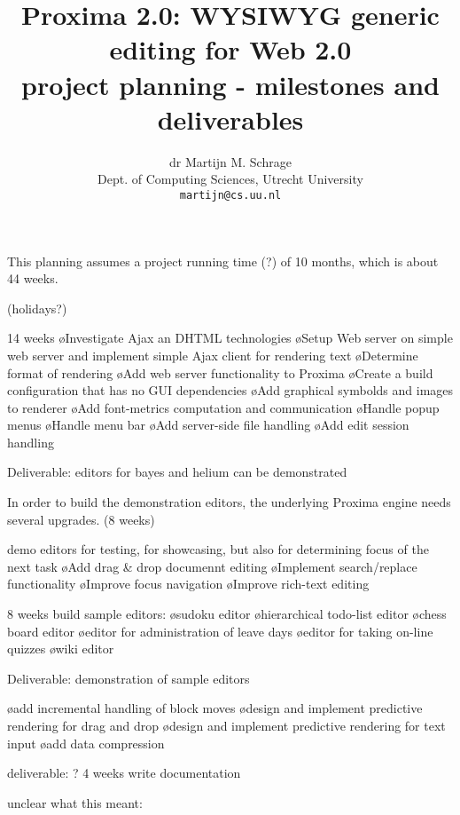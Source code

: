 \documentclass[10pt]{article}
\title{Proxima 2.0: WYSIWYG generic editing for Web 2.0\\
\bigskip
        \large project planning - milestones and deliverables}
\author{dr Martijn M. Schrage\\
        \small Dept. of Computing Sciences, Utrecht University\\
        \small {\tt martijn@cs.uu.nl}
        }
\date{}
\begin{document}
\maketitle

This planning assumes a project running time (?) of 10 months, which is about 44 weeks.

(holidays?)

14 weeks
\bl
\o Investigate Ajax an DHTML technologies
\o Setup Web server on simple web server and implement simple Ajax client for rendering text
\o Determine format of rendering
\o Add web server functionality to Proxima
\o Create a build configuration that has no GUI dependencies
\o Add graphical symbolds and images to renderer
\o Add font-metrics computation and communication
\o Handle popup menus
\o Handle menu bar
\o Add server-side file handling
\o Add edit session handling
\el

Deliverable: editors for bayes and helium can be demonstrated


In order to build the demonstration editors, the underlying Proxima engine needs several upgrades. (8 weeks)

demo editors for testing, for showcasing, but also for determining focus of the next task
\bl
\o Add drag \& drop documennt editing
\o Implement search/replace functionality
\o Improve focus navigation
\o Improve rich-text editing
\el

8 weeks
\bl
build sample editors:
\o sudoku editor
\o hierarchical todo-list editor
\o chess board editor
\o editor for administration of leave days
\o editor for taking on-line quizzes
\o wiki editor
\el

Deliverable: demonstration of sample editors


\bl
\o add incremental handling of block moves
\o design and implement predictive rendering for drag and drop
\o design and implement predictive rendering for text input
\o add data compression
\el

deliverable: ?
4 weeks
write documentation


\bc
unclear what this meant:


\ec
\end{document}
